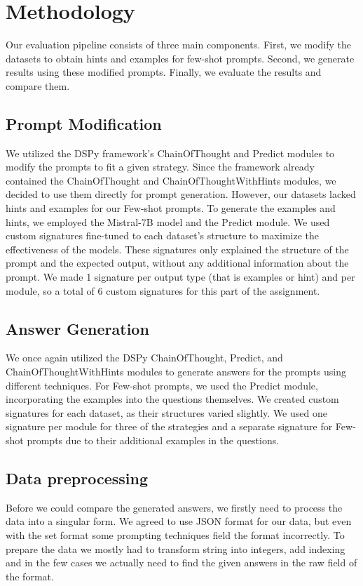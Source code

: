 \documentclass[fleqn,moreauthors,10pt]{ds_report}
\begin{document}

\section*{Methodology}
Our evaluation pipeline consists of three main components. First, we modify the datasets to obtain hints and examples for few-shot prompts. Second, we generate results using these modified prompts. Finally, we evaluate the results and compare them.

\subsection*{Prompt Modification}
We utilized the DSPy framework's ChainOfThought and Predict modules to modify the prompts to fit a given strategy. Since the framework already contained the ChainOfThought and ChainOfThoughtWithHints modules, we decided to use them directly for prompt generation. However, our datasets lacked hints and examples for our Few-shot prompts. To generate the examples and hints, we employed the Mistral-7B model and the Predict module. We used custom signatures fine-tuned to each dataset's structure to maximize the effectiveness of the models. These signatures only explained the structure of the prompt and the expected output, without any additional information about the prompt. We made 1 signature per output type (that is examples or hint) and per module, so a total of 6 custom signatures for this part of the assignment.

\subsection*{Answer Generation}
We once again utilized the DSPy ChainOfThought, Predict, and ChainOfThoughtWithHints modules to generate answers for the prompts using different techniques. For Few-shot prompts, we used the Predict module, incorporating the examples into the questions themselves. We created custom signatures for each dataset, as their structures varied slightly. We used one signature per module for three of the strategies and a separate signature for Few-shot prompts due to their additional examples in the questions.

\subsection*{Data preprocessing}
Before we could compare the generated answers, we firstly need to process the data into a singular form. We agreed to use JSON format for our data, but even with the set format some prompting techniques field the format incorrectly. To prepare the data we mostly had to transform string into integers, add indexing and in the few cases we actually need to find the given answers in the raw field of the format.
\end{document}
